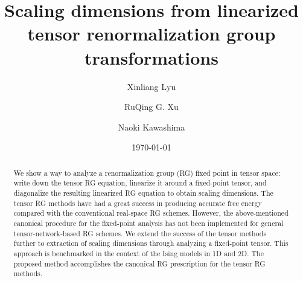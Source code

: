 \documentclass[aps,prr,reprint,superscriptaddress,floatfix]{revtex4-2}
\begin{document}

\title{Scaling dimensions from linearized tensor renormalization group transformations}



\author{Xinliang Lyu} 
 \author{RuQing G. Xu}
 \author{Naoki Kawashima}
     

\date{\today}

\begin{abstract} 
    We show a way to analyze a renormalization group (RG) fixed point in tensor space: write down the tensor RG equation, linearize it around a fixed-point tensor, and diagonalize the resulting linearized RG equation to obtain scaling dimensions. 
    The tensor RG methods have had a great success in producing accurate free energy compared with the conventional real-space RG schemes.
    However, the above-mentioned canonical procedure for the fixed-point analysis has not been implemented for general tensor-network-based RG schemes.
    We extend the success of the tensor methods further to extraction of scaling dimensions through analyzing a fixed-point tensor.
    This approach is benchmarked in the context of the Ising models in 1D and 2D.
    The proposed method accomplishes the canonical RG prescription for the tensor RG methods.
\end{abstract}
\end{document}
